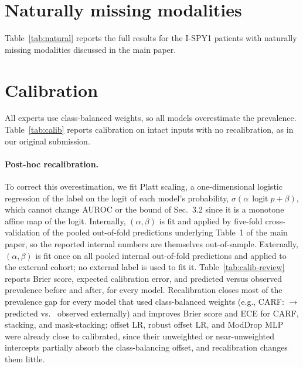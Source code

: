 \documentclass[a4paper,runningheads]{llncs}
\newcommand{\logit}{\operatorname{logit}}
\begin{document}
\section{Naturally missing modalities}

Table~\ref{tab:natural} reports the full results for the I-SPY1 patients with naturally missing modalities discussed in the main paper.

\begin{table}[h]
\centering
\caption{I-SPY1 patients with their true availability masks (columns: subset, number of patients/with pCR). ``all'' contains every patient with at least one optional modality; ``partial'' contains patients with exactly one.}
\label{tab:natural}
\setlength{\tabcolsep}{3pt}
\end{table}

\section{Calibration}

All experts use class-balanced weights, so all models overestimate the prevalence. Table~\ref{tab:calib} reports calibration on intact inputs with no recalibration, as in our original submission.

\begin{table}[h]
\centering
\caption{Calibration on intact inputs, no recalibration (lower is better).}
\label{tab:calib}
\small
{}
\end{table}

\paragraph{Post-hoc recalibration.} To correct this overestimation, we fit Platt scaling, a one-dimensional logistic regression of the label on the logit of each model's probability, $\sigma(\alpha\,\logit p+\beta)$, which cannot change AUROC or the bound of Sec.~3.2 since it is a monotone affine map of the logit. Internally, $(\alpha,\beta)$ is fit and applied by five-fold cross-validation of the pooled out-of-fold predictions underlying Table~1 of the main paper, so the reported internal numbers are themselves out-of-sample. Externally, $(\alpha,\beta)$ is fit once on all pooled internal out-of-fold predictions and applied to the external cohort; no external label is used to fit it. Table~\ref{tab:calib-review} reports Brier score, expected calibration error, and predicted versus observed prevalence before and after, for every model. Recalibration closes most of the prevalence gap for every model that used class-balanced weights (e.g., CARF: \CalibExtCarfPrevBefore{}$\to$\CalibExtCarfPrevAfter{} predicted vs.\ \CalibTruePrev{} observed externally) and improves Brier score and ECE for CARF, stacking, and mask-stacking; offset LR, robust offset LR, and ModDrop MLP were already close to calibrated, since their unweighted or near-unweighted intercepts partially absorb the class-balancing offset, and recalibration changes them little.
\end{document}
